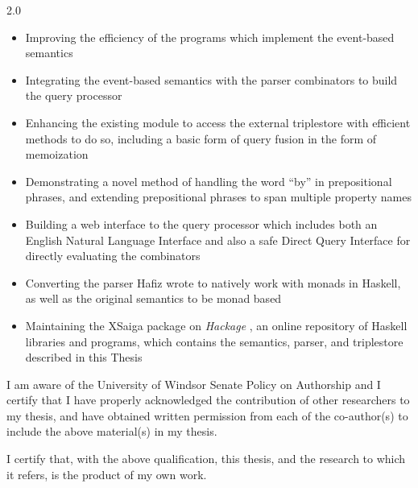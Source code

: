 \documentclass[fleqn, oneside, 12pt]{book}
\theoremstyle{definitionsty}
\newcommand{\uwindoublespacelen}{2.0}
\newenvironment{uwindoublespaceenv}%
{\begin{spacing}{\uwindoublespacelen}}%
	{\end{spacing}}
\begin{document}
\begin{uwindoublespaceenv}
	\begin{itemize}
		\item Improving the efficiency of the programs which implement the event-based semantics
		\item Integrating the event-based semantics with the parser combinators to build the query processor
		\item Enhancing the existing module to access the external triplestore with efficient methods to do so, including a basic form of query fusion in the form of memoization
		\item Demonstrating a novel method of handling the word ``by'' in prepositional phrases, and extending prepositional phrases to span multiple property names
		\item Building a web interface to the query processor which includes both an English Natural Language Interface and also a safe Direct Query Interface for directly evaluating the combinators
		\item Converting the parser Hafiz wrote\cite{frosthafiz2008} to natively work with monads in Haskell, as well as the original semantics \cite{frost2014demonstration} to be monad based
		\item Maintaining the XSaiga package on {\em Hackage} \cite{XSaiga:2016}, an online repository of Haskell libraries and programs, which contains the semantics, parser, and triplestore described in this Thesis
	\end{itemize}
	
	I am aware of the University of Windsor Senate Policy on Authorship and I certify that I have properly acknowledged the contribution of other researchers to my thesis, and have obtained written permission from each of the co-author(s) to include the above material(s) in my thesis. 
	
	I certify that, with the above qualification, this thesis, and the research to which it refers, is the product of my own work.
	
\end{uwindoublespaceenv}
\end{document}
